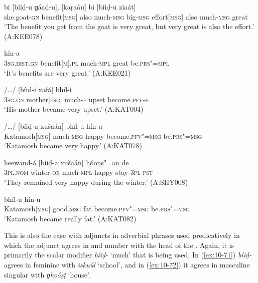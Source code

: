 \begin{exe}
\ex
\label{ex:10-65}
\gll [čhéel"=ii phaaidá] bi [bíiḍ-u ɡáaḍ-u], [kaṛaáu] bi [bíiḍ-u ziaát] \\
she.goat-\textsc{gn} benefit[\textsc{msg}] also much-\textsc{msg} big-\textsc{msg}  effort[\textsc{msg}] also much-\textsc{msg} great \\
\glt `The benefit you get from the goat is very great, but very great is also the effort.' (A:KEE078)

\ex
\label{ex:10-66}
 hín-a \\
\textsc{3sg}.\textsc{dist.gn} benefit[\textsc{m}].\textsc{pl} much-\textsc{mpl} great  be.\textsc{prs"=mpl} \\
\glt `It's benefits are very great.' (A:KEE021)

\ex
\label{ex:10-67}
 /{\ldots}/ [bíiḍ-i xafá] bhíl-i \\
\textsc{3sg.gn} mother[\textsc{fsg}] {} much-\textsc{f} upset become.\textsc{pfv-f} \\
\glt `His mother became very upset.' (A:KAT004)

\ex
\label{ex:10-68}
\gll [kaṭamúš] /{\ldots}/ [bíiḍ-u xušaán] bhíl-u hín-u \\
Katamosh[\textsc{msg}] {} much-\textsc{msg} happy become.\textsc{pfv"=msg} be.\textsc{prs"=msg}\\
\glt `Katamosh became very happy.' (A:KAT078)

\ex
\label{ex:10-69}
\gll [se] heewand-á [bíiḍ-a xušaán] hóons"=an de \\
\textsc{3pl.nom} winter-\textsc{ob} much-\textsc{mpl} happy stay-\textsc{3pl} \textsc{pst} \\
\glt `They remained very happy during the winter.' (A:SHY008)

\ex
\label{ex:10-70}
 bhíl-u hín-u \\
Katamosh[\textsc{msg}] good.\textsc{msg} fat become.\textsc{pfv"=msg}  be.\textsc{prs"=msg} \\
\glt `Katamosh became really fat.' (A:KAT082)
\end{exe}

This is also the case with adjuncts in adverbial phrases used predicatively in which the adjunct agrees in  and number with the  head of the . Again, it is primarily the scalar modifier \textit{bíiḍ-} `much' that is being used. In (\ref{ex:10-71}) \textit{bíiḍ-} agrees in feminine  with \textit{iskuúl} `school', and in (\ref{ex:10-72}) it agrees in masculine singular with \textit{ɡhoóṣṭ} `house'. 

